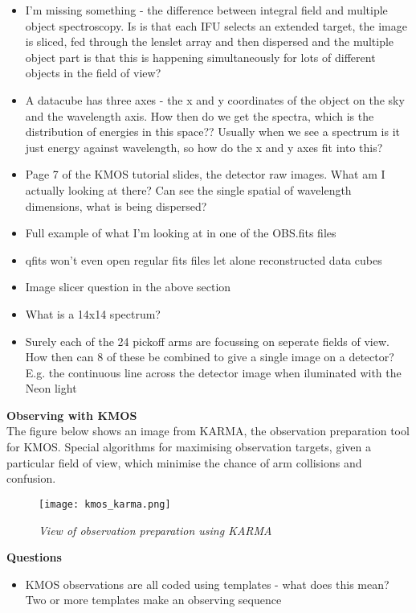 \documentclass{literature}
\begin{document}
\begin{itemize}
\item I'm missing something - the difference between integral field and multiple object spectroscopy. Is is that each IFU selects an extended target, the image is sliced, fed through the lenslet array and then dispersed and the multiple object part is that this is happening simultaneously for lots of different objects in the field of view? 
\item A datacube has three axes - the x and y coordinates of the object on the sky and the wavelength axis. How then do we get the spectra, which is the distribution of energies in this space?? Usually when we see a spectrum is it just energy against wavelength, so how do the x and y axes fit into this? 
\item Page 7 of the KMOS tutorial slides, the detector raw images. What am I actually looking at there? Can see the single spatial of wavelength dimensions, what is being dispersed? 
\item Full example of what I'm looking at in one of the OBS.fits files
\item qfits won't even open regular fits files let alone reconstructed data cubes
\item Image slicer question in the above section
\item What is a 14x14 spectrum? 
\item Surely each of the 24 pickoff arms are focussing on seperate fields of view. How then can 8 of these be combined to give a single image on a detector? E.g. the continuous line across the detector image when iluminated with the Neon light 
\end{itemize} 

\textbf{Observing with KMOS} \\

The figure below shows an image from KARMA, the observation preparation tool for KMOS. Special algorithms for maximising observation targets, given a particular field of view, which minimise the chance of arm collisions and confusion.

\begin{figure}[!htp]
\centering
\texttt{[image: kmos\_karma.png]}
\caption{\footnotesize{\emph{View of observation preparation using KARMA}}}
\label{fig:kmos_karma}
\end{figure} 



\textbf{Questions}
\begin{itemize}
	\item KMOS observations are all coded using templates - what does this mean? Two or more templates make an observing sequence
\end{itemize}
\end{document}
